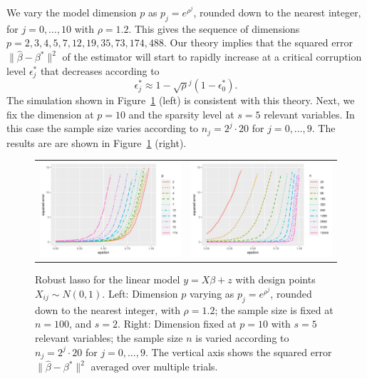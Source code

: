 We vary the model dimension $p$ as $p_{j} = e^{\rho^j}$, rounded down to the nearest integer, for $j=0,\ldots, 10$ with $\rho=1.2$. This gives the sequence of dimensions $p=2, 3, 4, 5, 7, 12, 19, 35, 73, 174, 488$. 
Our theory implies that the squared error $\|\hat \beta - \beta^*\|^2$ of the estimator will start to rapidly increase at a critical corruption level $\epsilon^*_j$ that decreases according to
$$ \epsilon^*_{j} \approx 1- \sqrt{\rho}^j (1-\epsilon^*_0).$$
The simulation shown in Figure~\ref{fig:exp1} (left) is consistent with this theory.
Next, we fix the dimension at $p=10$ and the sparsity level at $s=5$ relevant variables. In this case
the sample size varies according to $n_j = 2^j \cdot 20$ for $j=0,\ldots, 9$. The results are
are shown in Figure~\ref{fig:exp1} (right).


\begin{figure}[t]
\vskip20pt
  \begin{center}
    \begin{tabular}{cc}
      \hskip-10pt
      \includegraphics[width=.48\textwidth]{figures/fig2a}&
      \includegraphics[width=.48\textwidth]{figures/fig2b}\\[-5pt]
    \end{tabular}
  \end{center}
\caption{Robust lasso for the linear model  $y=X\beta + z$ with design points $X_{ij}\sim N(0,1)$.
Left: Dimension $p$ varying as $p_{j} = e^{\rho^j}$, rounded down to the nearest integer, with $\rho=1.2$; the sample size is fixed at $n=100$, and $s=2$. Right: Dimension fixed at $p=10$ with $s=5$ relevant variables; the sample size $n$ is varied according to
$n_j = 2^j \cdot 20$ for $j=0,\ldots, 9$. The vertical axis shows the squared error $\|\hat \beta - \beta^*\|^2$ averaged over multiple trials.}
\label{fig:exp1}
\end{figure}

